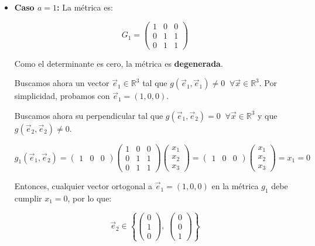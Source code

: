 \documentclass[12pt]{article}
\begin{document}
\begin{ejercicio}[4 puntos]
\begin{enumerate}
\begin{itemize}
				\item \textbf{Caso \( a = 1 \):} La métrica es:
				
				\[
				G_1 = 
				\begin{pmatrix}
					1 & 0 & 0 \\
					0 & 1 & 1 \\
					0 & 1 & 1
				\end{pmatrix}
				\]
				
				Como el determinante es cero, la métrica es \textbf{degenerada}.
				
				Buscamos ahora un vector \( \vec{e}_1 \in \mathbb{R}^3 \) tal que \( g(\vec{e}_1, \vec{e}_1) \neq 0 \;\; \forall \vec{x} \in \mathbb{R}^3 \). Por simplicidad, probamos con \( \vec{e}_1 = (1,0,0) \).
				
				Buscamos ahora su perpendicular tal que \( g(\vec{e}_1, \vec{e}_2) = 0 \;\; \forall \vec{x} \in \mathbb{R}^3 \) y que \( g(\vec{e}_2, \vec{e}_2) \neq 0 \).
				
				\[
				g_1(\vec{e}_1, \vec{e}_2) = 
				\begin{pmatrix} 1 & 0 & 0 \end{pmatrix}
				\begin{pmatrix}
					1 & 0 & 0 \\
					0 & 1 & 1 \\
					0 & 1 & 1
				\end{pmatrix}
				\begin{pmatrix} x_1 \\ x_2 \\ x_3 \end{pmatrix}
				= 
				\begin{pmatrix} 1 & 0 & 0 \end{pmatrix}
				\begin{pmatrix} x_1 \\ x_2 \\ x_3 \end{pmatrix}
				= x_1 = 0
				\]
				
				Entonces, cualquier vector ortogonal a \( \vec{e}_1 = (1,0,0) \) en la métrica \( g_1 \) debe cumplir \( x_1 = 0 \), por lo que:
				
				\[
				\vec{e}_2 \in \left\lbrace 
				\begin{pmatrix} 0 \\ 1 \\ 0 \end{pmatrix},\;
				\begin{pmatrix} 0 \\ 0 \\ 1 \end{pmatrix} 
				\right\rbrace
				\]
				

\end{itemize}
\end{enumerate}
\end{ejercicio}
\end{document}
